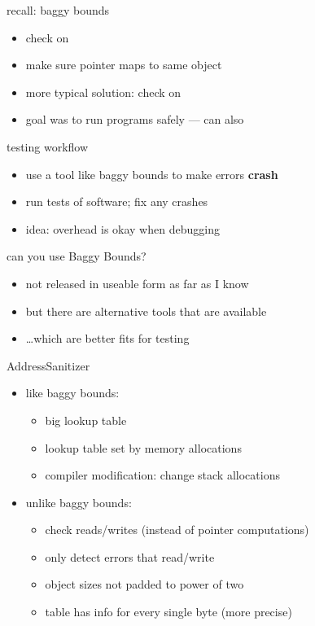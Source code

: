\begin{frame}{recall: baggy bounds}
    \begin{itemize}
    \item check on 
    \item make sure pointer maps to same object
        \vspace{.5cm}
        \item more typical solution: check on 
        \item goal was to run programs safely --- can also 
    \end{itemize}
\end{frame}

\begin{frame}{testing workflow}
    \begin{itemize}
    \item use a tool like baggy bounds to make errors \textbf{crash}
    \item run  tests of software; fix any crashes
        \vspace{.5cm}
    \item idea: overhead is okay when debugging
    \end{itemize}
\end{frame}

\begin{frame}{can you use Baggy Bounds?}
    \begin{itemize}
    \item not released in useable form as far as I know
    \item but there are alternative tools that are available
    \item \ldots which are better fits for testing
    \end{itemize}
\end{frame}

\begin{frame}{AddressSanitizer}
    \begin{itemize}
    \item like baggy bounds:
        \begin{itemize}
        \item big lookup table
        \item lookup table set by memory allocations
        \item compiler modification: change stack allocations
        \end{itemize}
    \item unlike baggy bounds:
        \begin{itemize}
        \item check reads/writes (instead of pointer computations)
        \item only detect errors that read/write 
        \item object sizes not padded to power of two
        \item table has info for every single byte (more precise)
        \end{itemize}
    \end{itemize}
\end{frame}

